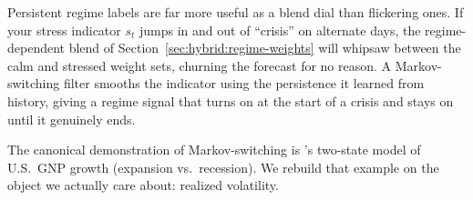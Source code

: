 \begin{projectconnection}
Persistent regime labels are far more useful as a blend dial than
flickering ones.  If your stress indicator $s_t$ jumps in and out of
``crisis'' on alternate days, the regime-dependent blend of
Section~\ref{sec:hybrid:regime-weights} will whipsaw between the calm and
stressed weight sets, churning the forecast for no reason.  A
Markov-switching filter smooths the indicator using the persistence it
learned from history, giving a regime signal that turns on at the start of
a crisis and stays on until it genuinely ends.
\end{projectconnection}

The canonical demonstration of Markov-switching is \citet{Hamilton1989}'s
two-state model of U.S.\ GNP growth (expansion vs.\ recession).  We rebuild
that example on the object we actually care about: realized volatility.

